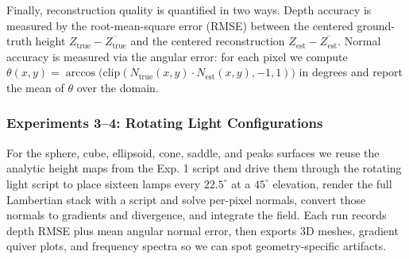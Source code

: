 \documentclass[11pt]{article}
\begin{document}
Finally, reconstruction quality is quantified in two ways. Depth accuracy is measured by the root-mean-square error (RMSE) between the centered ground-truth height $Z_{\text{true}} - \overline{Z_{\text{true}}}$ and the centered reconstruction $Z_{\text{est}} - \overline{Z_{\text{est}}}$. Normal accuracy is measured via the angular error: for each pixel we compute $\theta(x,y) = \arccos\bigl(\mathrm{clip}(N_{\text{true}}(x,y)\cdot N_{\text{est}}(x,y),-1,1)\bigr)$ in degrees and report the mean of $\theta$ over the domain.

\subsubsection{Experiments 3--4: Rotating Light Configurations}

For the sphere, cube, ellipsoid, cone, saddle, and peaks surfaces we reuse the analytic height maps from the Exp. 1 script and drive them
through the rotating light script to place sixteen lamps every $22.5^\circ$ at a $45^\circ$ elevation, render the full Lambertian stack with a script and solve
per-pixel normals, convert those normals to gradients and divergence, and integrate the field. Each run records depth RMSE
plus mean angular normal error, then exports 3D meshes, gradient quiver plots, and frequency spectra so we can spot geometry-specific artifacts.

\begin{center}
\end{center}
\end{document}
